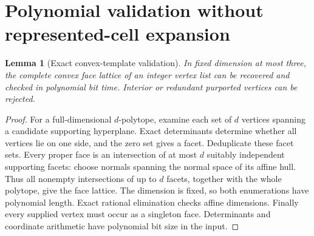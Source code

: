 \documentclass[11pt]{article}
\newtheorem{lemma}[theorem]{Lemma}
\theoremstyle{definition}\newtheorem{definition}[theorem]{Definition}
\theoremstyle{remark}\newtheorem{remark}[theorem]{Remark}
\begin{document}
\section{Polynomial validation without represented-cell expansion}
\label{sec:validation}

\begin{lemma}[Exact convex-template validation]\label{lem:convex}
In fixed dimension at most three, the complete convex face lattice of an integer vertex list can be recovered and checked in polynomial bit time. Interior or redundant purported vertices can be rejected.
\end{lemma}
\begin{proof}
For a full-dimensional \(d\)-polytope, examine each set of \(d\) vertices spanning a candidate supporting hyperplane. Exact determinants determine whether all vertices lie on one side, and the zero set gives a facet. Deduplicate these facet sets. Every proper face is an intersection of at most \(d\) suitably independent supporting facets: choose normals spanning the normal space of its affine hull. Thus all nonempty intersections of up to \(d\) facets, together with the whole polytope, give the face lattice. The dimension is fixed, so both enumerations have polynomial length. Exact rational elimination checks affine dimensions. Finally every supplied vertex must occur as a singleton face. Determinants and coordinate arithmetic have polynomial bit size in the input.
\end{proof}
\end{document}
